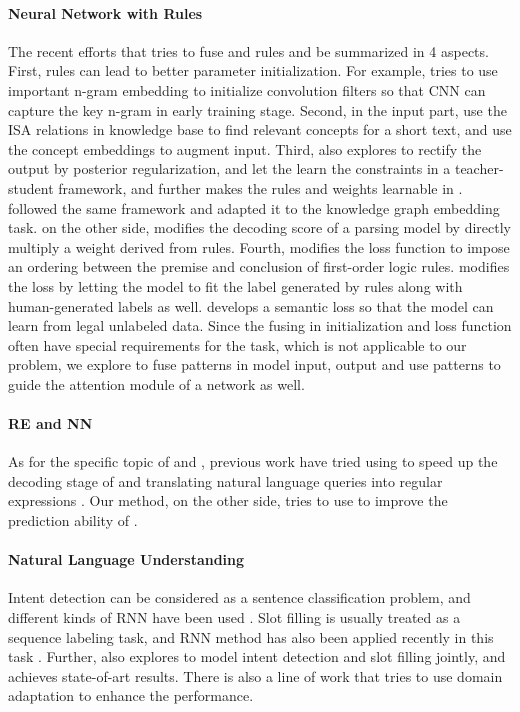 \paragraph{Neural Network with Rules}
The recent efforts that tries to fuse \NN and rules and be summarized in 4 aspects. First, rules can lead to better parameter initialization. For example, \cite{li2017initializing} tries to use important n-gram embedding to initialize convolution filters so that CNN can capture the key n-gram in early training stage. Second, in the input part, \cite{wangcombining17} use the ISA relations in knowledge base to find relevant concepts for a short text, and use the concept embeddings to augment input. Third, \cite{hu2016harnessing} also explores to rectify the \NN output by posterior regularization, and let the \NN learn the constraints in a teacher-student framework, and further makes the rules and weights learnable in \cite{hu2016deep}. \cite{guo2017knowledge} followed the same framework and adapted it to the knowledge graph embedding task. \cite{xiao2017symbolic} on the other side, modifies the decoding score of a parsing model by directly multiply a weight derived from rules. Fourth, \cite{demeester2016lifted} modifies the loss function to impose an ordering between the premise and conclusion of first-order logic rules. \cite{alashkar2017examples} modifies the loss by letting the model to fit the label generated by rules along with human-generated labels as well. \cite{xu2017semantic} develops a semantic loss so that the model can learn from legal unlabeled data. Since the fusing in initialization and loss function often have special requirements for the task, which is not applicable to our problem, we explore to fuse \RE patterns in model input, output and use \RE patterns to guide the attention module of a network as well.   

\paragraph{RE and NN}
As for the specific topic of \RE and \NN, previous work have tried using \RE to speed up the decoding stage of \NN \cite{strauss2016regular} and translating natural language queries into regular expressions \cite{locascio2016neural}. Our method, on the other side, tries to use \RE to improve the prediction ability of \NN.


\paragraph{Natural Language Understanding}
Intent detection can be considered as a sentence classification problem, and different kinds of RNN have been used \cite{ravuri2015comparative}. Slot filling is usually treated as a sequence labeling task, and RNN method has also been applied recently in this task \cite{mesnil2015using}. Further, \cite{liu2016attention, zhang2016joint} also explores to model intent detection and slot filling jointly, and achieves state-of-art results. There is also a line of work that tries to use domain adaptation \cite{kim2017domain, liu2017multi, zhu2017concept} to enhance the \NLU performance.



